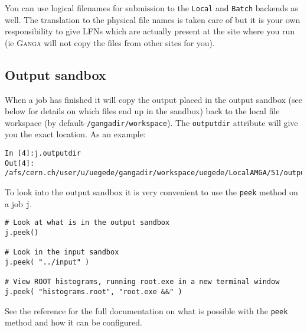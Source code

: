 \documentclass{howto}
\def\ganga {\textsc{Ganga}\xspace}
\begin{document}
You can use logical filenames for submission to the \texttt{Local} and
\texttt{Batch} backends as well. The translation to the physical file names is
taken care of but it is your own responsibility to give LFNs which are
actually present at the site where you run (ie \ganga will not copy the files
from other sites for you).

\subsection{Output sandbox}
\label{sec:OutputSandbox}
When a job has finished it will copy the output placed in the output sandbox 
(see below for details on which files end up in the sandbox)
back to the local file
workspace (by default \texttt{$\tilde{}$/gangadir/workspace}). The
\texttt{outputdir} attribute will give you the exact location. As an example:
\begin{verbatim}
In [4]:j.outputdir
Out[4]: /afs/cern.ch/user/u/uegede/gangadir/workspace/uegede/LocalAMGA/51/output
\end{verbatim}

To look into the output sandbox it is very convenient to use the \texttt{peek}
method on a job \texttt{j}.
\begin{verbatim}
# Look at what is in the output sandbox
j.peek()

# Look in the input sandbox
j.peek( "../input" )

# View ROOT histograms, running root.exe in a new terminal window
j.peek( "histograms.root", "root.exe &&" )
\end{verbatim}

See the reference for the full documentation on what is possible with the
\texttt{peek} method and how it can be configured.
\end{document}
